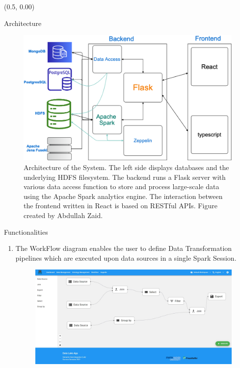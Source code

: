 \documentclass[12pt]{beamer}
\begin{document}
\begin{textblock}{0.5}(0.5, 0.00)


\begin{block}{Architecture}
\begin{figure}[H]
\includegraphics[width=0.8\linewidth,height=0.20\textheight]{data.png}
\caption{Architecture of the System. The left side displays databases and the underlying HDFS filesystem. The backend runs a Flask server with various data access function to store and process large-scale data using the Apache Spark analytics engine. The interaction between the frontend written in React is based on RESTful APIs. Figure created by Abdullah Zaid.} \label{Figure 1}
\end{figure} 
\end{block}




\begin{block}{Functionalities}
\begin{enumerate}
\item The WorkFlow diagram enables the user to define Data Transformation pipelines which are executed upon data sources in a single Spark Session.
\begin{figure}[H]
\includegraphics[width=1\linewidth]{datamart.JPG} 
\label{WorkFlow}
\end{figure}   
 

\end{enumerate}
\end{block}
\end{textblock}
\end{document}
